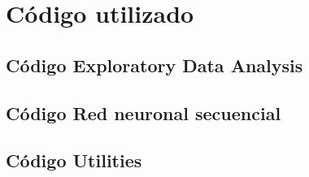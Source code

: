 \chapter{Código utilizado}

\section{Código Exploratory Data Analysis}



\section{Código Red neuronal secuencial}





\section{Código Utilities}


